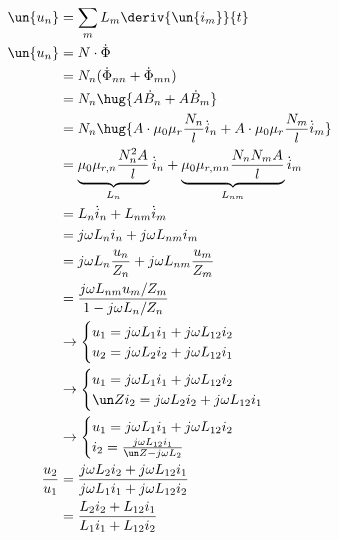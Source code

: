 \documentclass[11pt]{article}
\begin{document}
\subsection{}
\begin{align*}
    \un {u_n} &= \sum_m L_m \deriv{\un{i_m}}{t}\\
    \un {u_n} &= N \cdot \dot \Phi\\
    &= N_n(\dot \Phi_{nn} + \dot \Phi_{mn})\\
    &= N_n\hug{A \dot B_{n} + A \dot B_{m}}\\
    &= N_n\hug{A \cdot \mu_0 \mu_r \frac{N_n}{l} \dot i_n + A \cdot \mu_0 \mu_r \frac{N_m}{l} \dot i_m}\\
    &= \underbrace{\mu_0 \mu_{r,n} \frac{N_n^2 A }{l}}_{L_n} \dot i_n + \underbrace{\mu_0 \mu_{r,mn} \frac{N_n N_m A}{l}}_{L_{nm}} \dot i_m\\
    &= L_n\dot i_n + L_{nm} \dot i_m\\
    &= j \omega L_n i_n + j \omega L_{nm}i_m\\
    &= j \omega L_n \frac{u_n}{Z_n} + j \omega L_{nm}\frac{u_m}{Z_m} \\
    &= \frac{j \omega L_{nm} u_m / Z_m}{1-j \omega L_n / Z_n} \\
    &\rightarrow\begin{cases}
        u_1 = j \omega L_1 i_1 + j \omega L_{12} i_2\\
        u_2 = j \omega L_2 i_2 + j \omega L_{12} i_1\\
    \end{cases}\\
    &\rightarrow\begin{cases}
        u_1 = j \omega L_1 i_1 + j \omega L_{12} i_2\\
        \un Z i_2 = j \omega L_2 i_2 + j \omega L_{12} i_1\\
    \end{cases}\\
    &\rightarrow\begin{cases}
        u_1 = j \omega L_1 i_1 + j \omega L_{12} i_2\\
        i_2=  \frac{j \omega L_{12} i_1}{\un Z- j \omega L_2 }\\
    \end{cases}\\
    \frac{u_2}{u_1} &= \frac{j \omega L_2 i_2 + j \omega L_{12} i_1}{j \omega L_1 i_1 + j \omega L_{12} i_2}\\
    &= \frac{L_2 i_2 +L_{12} i_1}{L_1 i_1 + L_{12} i_2}\\
\end{align*}
\end{document}
